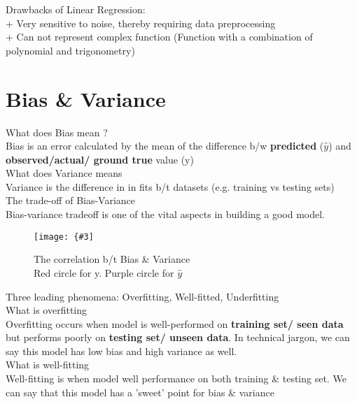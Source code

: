 \documentclass[12pt,a4paper]{article}
\newcommand{\img}[3]{
	\texttt{[image: \{\#3]}}}
\begin{document}
\noindent Drawbacks of Linear Regression:\\
+ Very sensitive to noise, thereby requiring data preprocessing\\
+ Can not represent complex function (Function with a combination of polynomial and trigonometry)

\section{Bias \& Variance}
\noindent What does Bias mean ?\\
\indent Bias is an error calculated by the mean of the difference b/w \textbf{predicted} ($\hat{y}$) and \textbf{observed/actual/ ground true} value (y)\\

\noindent What does Variance means\\
\indent Variance is the difference in in fits b/t datasets (e.g. training vs testing sets)\\

\noindent The trade-off of Bias-Variance\\
\indent Bias-variance tradeoff is one of the vital aspects in building a good model.\\
\begin{figure}[h!]
\centering\img{7cm}{7cm}{Picture/Bias-Variance/1.jpg}
\caption{The correlation b/t Bias \& Variance\\Red circle for y. Purple circle for $\hat{y}$}
\end{figure}
\newline
Three leading phenomena: Overfitting, Well-fitted, Underfitting\\

\noindent What is overfitting\\
\indent Overfitting occurs when model is well-performed on \textbf{training set/ seen data} but performs poorly on \textbf{testing set/ unseen data}. In technical jargon, we can say this model has low bias and high variance as well.\\

\noindent What is well-fitting\\
\indent Well-fitting is when model well performance on both training \& testing set. We can say that this model has a 'sweet' point for bias \& variance\\
\end{document}
